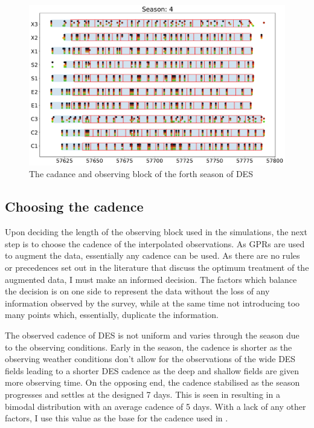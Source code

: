\begin{figure}[h]
  \includegraphics[width=\textwidth]{Figures/Chapter5/ObsBlock_Season4.pdf}
  \caption{The cadance and observing block of the forth season of DES}
  \label{fig:ObsBlock4}
\end{figure}

\subsection{Choosing the cadence} \label{sec:SimCadance}
Upon deciding the length of the observing block used in the simulations, the next step is to choose the cadence of the interpolated observations. As GPRs are used to augment the data, essentially any cadence can be used. As there are no rules or precedences set out in the literature that discuss the optimum treatment of the augmented data, I must make an informed decision. The factors which balance the decision is on one side to represent the data without the loss of any information observed by the survey, while at the same time not introducing too many points which, essentially, duplicate the information.

The observed cadence of DES is not uniform and varies through the season due to the observing conditions. Early in the season, the cadence is shorter as the observing weather conditions don't allow for the observations of the wide DES fields leading to a shorter DES cadence as the deep and shallow fields are given more observing time. On the opposing end, the cadence stabilised as the season progresses and settles at the designed 7 days. This is seen in  resulting in a bimodal distribution with an average cadence of 5 days. With a lack of any other factors, I use this value as the base for the cadence used in .

